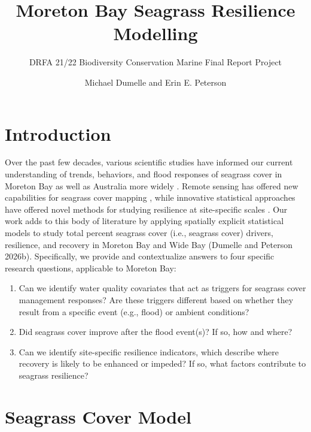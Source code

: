 \documentclass[
  letterpaper,
  DIV=11,
  numbers=noendperiod]{scrartcl}
\title{Moreton Bay Seagrass Resilience Modelling}
\subtitle{DRFA 21/22 Biodiversity Conservation Marine Final Report
Project}
\author{Michael Dumelle and Erin E. Peterson}
\date{}
\providecommand{\tightlist}{%
  \setlength{\itemsep}{0pt}\setlength{\parskip}{0pt}}
\renewcommand*\contentsname{Table of contents}
\newcommand\contentsname{Table of contents}
\begin{document}
\maketitle

\renewcommand*\contentsname{Table of contents}
{
\hypersetup{linkcolor=}
\setcounter{tocdepth}{3}
\tableofcontents
}

\section{Introduction}\label{introduction}

Over the past few decades, various scientific studies have informed our
current understanding of trends, behaviors, and flood responses of
seagrass cover in Moreton Bay
\citep{abal1996seagrass, udy1997growth, samper2016organic, ovsyanikova2026spatial}
as well as Australia more widely
\citep{kilminster2015unravelling, gilby2018seagrass, o2018seagrass}.
Remote sensing has offered new capabilities for seagrass cover mapping
\citep{roelfsema2009integrated}, while innovative statistical approaches
have offered novel methods for studying resilience at site-specific
scales \citep{gilby2023drivers}. Our work adds to this body of
literature by applying spatially explicit statistical models
\citep{cressie1993statistics} to study total percent seagrass cover
(i.e., seagrass cover) drivers, resilience, and recovery in Moreton Bay
and Wide Bay (Dumelle and Peterson 2026b). Specifically, we provide and
contextualize answers to four specific research questions, applicable to
Moreton Bay:

\begin{enumerate}
\def\labelenumi{\arabic{enumi}.}
\tightlist
\item
  Can we identify water quality covariates that act as triggers for
  seagrass cover management responses? Are these triggers different
  based on whether they result from a specific event (e.g., flood) or
  ambient conditions?
\item
  Did seagrass cover improve after the flood event(s)? If so, how and
  where?
\item
  Can we identify site-specific resilience indicators, which describe
  where recovery is likely to be enhanced or impeded? If so, what
  factors contribute to seagrass resilience?
\end{enumerate}

\section{Seagrass Cover Model}\label{seagrass-cover-model}
\end{document}
